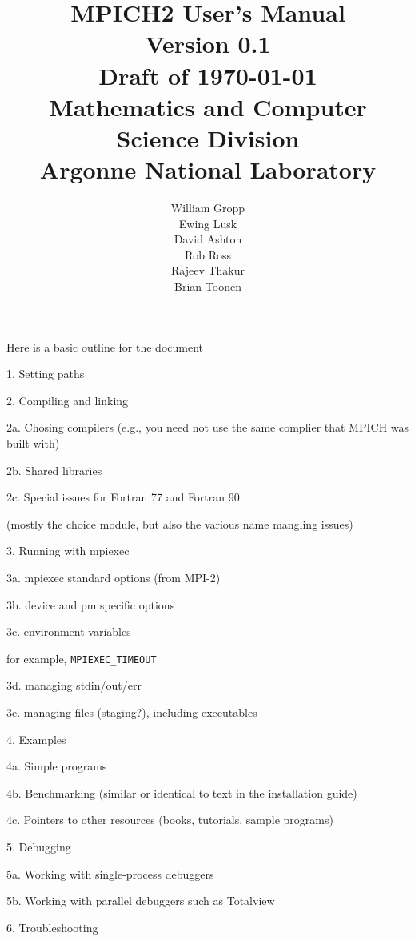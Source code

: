 \documentclass[dvipdfm,11pt]{article}
\begin{document}
\title{MPICH2 User's Manual\\
Version 0.1\\
Draft of \today\\
Mathematics and Computer Science Division\\
Argonne National Laboratory}

\author{William Gropp\\
Ewing Lusk\\
David Ashton\\
Rob Ross\\
Rajeev Thakur\\
Brian Toonen}

\maketitle

\cleardoublepage

\tableofcontents
\clearpage

\pagestyle{headings}


Here is a basic outline for the document

1. Setting paths

2. Compiling and linking

  2a. Chosing compilers (e.g., you need not use the same complier that
      MPICH was built with)

  2b. Shared libraries

  2c. Special issues for Fortran 77 and Fortran 90
 
      (mostly the choice module, but also the various name mangling issues)

3. Running with mpiexec

  3a. mpiexec standard options (from MPI-2)

  3b. device and pm specific options

  3c. environment variables

      for example, \texttt{MPIEXEC\_TIMEOUT}

  3d. managing stdin/out/err

  3e. managing files (staging?), including executables

4. Examples 

   4a. Simple programs
  
   4b. Benchmarking (similar or identical to text in the installation guide)

   4c. Pointers to other resources (books, tutorials, sample programs)

5. Debugging

   5a. Working with single-process debuggers

   5b. Working with parallel debuggers such as Totalview

6. Troubleshooting
\end{document}
